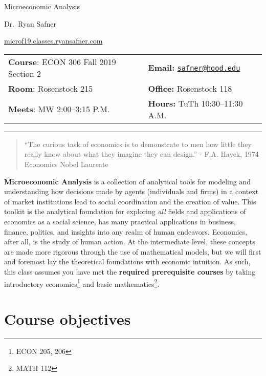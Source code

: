 \documentclass{article}
\begin{document}
\sffamily

\centerline{\Huge Microeconomic Analysis}

\vspace{3 mm}

\centerline{\large Dr.~Ryan Safner}
\vspace{2 mm}
\centerline{\large \href{http://microf19.classes.ryansafner.com}{microf19.classes.ryansafner.com}}

\vspace{5 mm}

\begin{tabular}{@{}p{3.5in}p{3.5in}}           
\textbf{Course}: ECON 306 Fall 2019 Section 2 & \textbf{Email:}  \href{mailto:safner@hood.edu}{\nolinkurl{safner@hood.edu}}\\
\textbf{Room}: Rosenstock 215 & \textbf{Office:}  Rosenstock 118\\
\textbf{Meets}: MW 2:00--3:15 P.M. & \textbf{Hours:} TuTh 10:30--11:30 A.M.\\ 
\end{tabular}

\vspace{5 mm}

\hrule


\begin{quote}
``The curious task of economics is to demonstrate to men how little they
really know about what they imagine they can design.'' - F.A. Hayek,
1974 Economics Nobel Laureate
\end{quote}

\textbf{Microeconomic Analysis} is a collection of analytical tools for
modeling and understanding how decisions made by agents (individuals and
firms) in a context of market institutions lead to social coordination
and the creation of value. This toolkit is the analytical foundation for
exploring \emph{all} fields and applications of economics as a social
science, has many practical applications in business, finance, politics,
and insights into any realm of human endeavors. Economics, after all, is
the study of human action. At the intermediate level, these concepts are
made more rigorous through the use of mathematical models, but we will
first and foremost lay the theoretical foundations with economic
intuition. As such, this class assumes you have met the \textbf{required
prerequisite courses} by taking introductory economics\footnote{ECON
  205, 206} and basic mathematics\footnote{MATH 112}.

\hypertarget{course-objectives}{%
\section{Course objectives}\label{course-objectives}}
\end{document}
